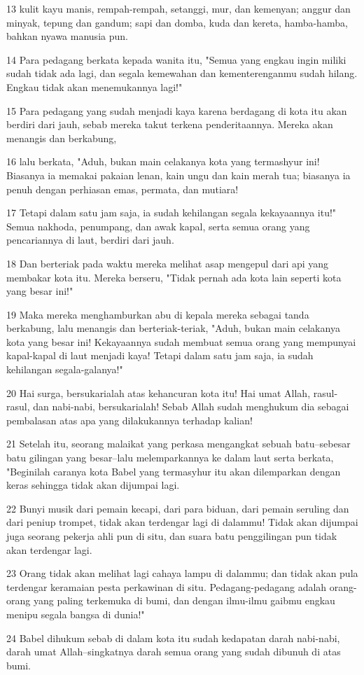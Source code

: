 \par 13 kulit kayu manis, rempah-rempah, setanggi, mur, dan kemenyan; anggur dan minyak, tepung dan gandum; sapi dan domba, kuda dan kereta, hamba-hamba, bahkan nyawa manusia pun.
\par 14 Para pedagang berkata kepada wanita itu, "Semua yang engkau ingin miliki sudah tidak ada lagi, dan segala kemewahan dan kementerenganmu sudah hilang. Engkau tidak akan menemukannya lagi!"
\par 15 Para pedagang yang sudah menjadi kaya karena berdagang di kota itu akan berdiri dari jauh, sebab mereka takut terkena penderitaannya. Mereka akan menangis dan berkabung,
\par 16 lalu berkata, "Aduh, bukan main celakanya kota yang termashyur ini! Biasanya ia memakai pakaian lenan, kain ungu dan kain merah tua; biasanya ia penuh dengan perhiasan emas, permata, dan mutiara!
\par 17 Tetapi dalam satu jam saja, ia sudah kehilangan segala kekayaannya itu!" Semua nakhoda, penumpang, dan awak kapal, serta semua orang yang pencariannya di laut, berdiri dari jauh.
\par 18 Dan berteriak pada waktu mereka melihat asap mengepul dari api yang membakar kota itu. Mereka berseru, "Tidak pernah ada kota lain seperti kota yang besar ini!"
\par 19 Maka mereka menghamburkan abu di kepala mereka sebagai tanda berkabung, lalu menangis dan berteriak-teriak, "Aduh, bukan main celakanya kota yang besar ini! Kekayaannya sudah membuat semua orang yang mempunyai kapal-kapal di laut menjadi kaya! Tetapi dalam satu jam saja, ia sudah kehilangan segala-galanya!"
\par 20 Hai surga, bersukarialah atas kehancuran kota itu! Hai umat Allah, rasul-rasul, dan nabi-nabi, bersukarialah! Sebab Allah sudah menghukum dia sebagai pembalasan atas apa yang dilakukannya terhadap kalian!
\par 21 Setelah itu, seorang malaikat yang perkasa mengangkat sebuah batu--sebesar batu gilingan yang besar--lalu melemparkannya ke dalam laut serta berkata, "Beginilah caranya kota Babel yang termasyhur itu akan dilemparkan dengan keras sehingga tidak akan dijumpai lagi.
\par 22 Bunyi musik dari pemain kecapi, dari para biduan, dari pemain seruling dan dari peniup trompet, tidak akan terdengar lagi di dalammu! Tidak akan dijumpai juga seorang pekerja ahli pun di situ, dan suara batu penggilingan pun tidak akan terdengar lagi.
\par 23 Orang tidak akan melihat lagi cahaya lampu di dalammu; dan tidak akan pula terdengar keramaian pesta perkawinan di situ. Pedagang-pedagang adalah orang-orang yang paling terkemuka di bumi, dan dengan ilmu-ilmu gaibmu engkau menipu segala bangsa di dunia!"
\par 24 Babel dihukum sebab di dalam kota itu sudah kedapatan darah nabi-nabi, darah umat Allah--singkatnya darah semua orang yang sudah dibunuh di atas bumi.

